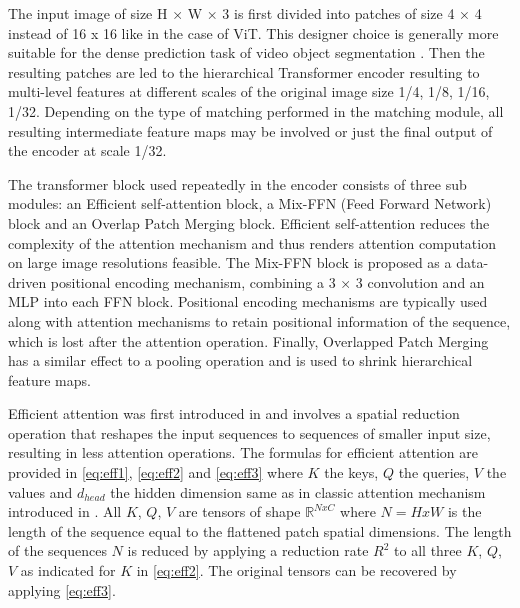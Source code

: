 The input image of size H × W × 3 is first divided into patches of size 4 × 4 instead of 16 x 16 like in the case of ViT. This designer choice is generally more suitable for the dense prediction task of video object segmentation \parencite{dosovitskiy2020vit}. Then the resulting patches are led to the hierarchical Transformer encoder resulting to multi-level features at different scales of the original image size {1/4, 1/8, 1/16, 1/32}. Depending on the type of matching performed in the matching module, all resulting intermediate feature maps may be involved or just the final output of the encoder at scale 1/32.\par

The transformer block used repeatedly in the encoder consists of three sub modules: an Efficient self-attention block, a Mix-FFN (Feed Forward Network) block
and an Overlap Patch Merging block. Efficient self-attention reduces the complexity of the attention mechanism and thus renders attention computation on large image resolutions feasible. The Mix-FFN block is proposed as a data-driven positional encoding mechanism, combining a 3 × 3 convolution and
an \gls{MLP} into each FFN block. Positional encoding mechanisms are typically used along with attention mechanisms to retain positional information of the sequence, which is lost after the attention operation. Finally, Overlapped Patch Merging has a similar effect to a pooling operation and is used to shrink hierarchical feature maps. \par


Efficient attention was first introduced in \parencite{pyramid_vision} and involves a spatial reduction operation that reshapes the input sequences to sequences of smaller input size, resulting in less attention operations. The formulas for efficient attention are provided in \eqref{eq:eff1}, \eqref{eq:eff2} and \eqref{eq:eff3} where $K$ the keys, $Q$ the queries, $V$ the values and $d_{head}$ the hidden dimension same as in classic attention mechanism introduced in \parencite{AttentionIsAllYouNeed}. All $K$, $Q$, $V$ are tensors of shape $\mathbb{R}^{NxC}$ where $N = H x W $ is the length of the sequence equal to the flattened patch spatial dimensions. The length of the sequences $N$ is reduced by applying a reduction rate $R^2$ to all three $K$, $Q$, $V$ as indicated for $K$ in \eqref{eq:eff2}. The original tensors can be recovered by applying \eqref{eq:eff3}.

